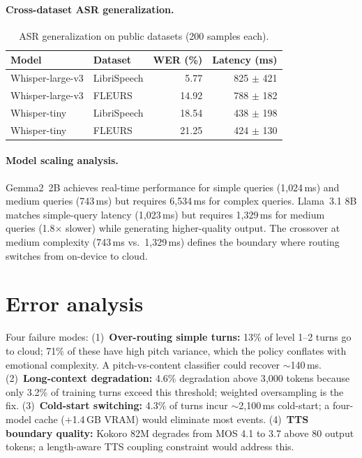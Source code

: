 \documentclass{article}
\begin{document}
\paragraph{Cross-dataset ASR generalization.}

\begin{table}[H]
\centering
\caption{ASR generalization on public datasets (200 samples each).}
\label{tab:cross_dataset}
\small
\begin{tabular}{llrr}
\toprule
Model & Dataset & WER (\%) & Latency (ms) \\
\midrule
Whisper-large-v3 & LibriSpeech & 5.77 & 825 $\pm$ 421 \\
Whisper-large-v3 & FLEURS & 14.92 & 788 $\pm$ 182 \\
Whisper-tiny & LibriSpeech & 18.54 & 438 $\pm$ 198 \\
Whisper-tiny & FLEURS & 21.25 & 424 $\pm$ 130 \\
\bottomrule
\end{tabular}
\end{table}

\paragraph{Model scaling analysis.} Gemma2~2B achieves real-time performance for simple queries (1{,}024\,ms) and medium queries (743\,ms) but requires 6{,}534\,ms for complex queries. Llama~3.1 8B matches simple-query latency (1{,}023\,ms) but requires 1{,}329\,ms for medium queries (1.8$\times$ slower) while generating higher-quality output. The crossover at medium complexity (743\,ms vs.\ 1{,}329\,ms) defines the boundary where routing switches from on-device to cloud.

\section{Error analysis}
\label{app:error}

Four failure modes: (1)~\textbf{Over-routing simple turns:} 13\% of level 1--2 turns go to cloud; 71\% of these have high pitch variance, which the policy conflates with emotional complexity. A pitch-vs-content classifier could recover $\sim$140\,ms. (2)~\textbf{Long-context degradation:} 4.6\% degradation above 3{,}000 tokens because only 3.2\% of training turns exceed this threshold; weighted oversampling is the fix. (3)~\textbf{Cold-start switching:} 4.3\% of turns incur $\sim$2{,}100\,ms cold-start; a four-model cache ($+$1.4\,GB VRAM) would eliminate most events. (4)~\textbf{TTS boundary quality:} Kokoro 82M degrades from MOS 4.1 to 3.7 above 80 output tokens; a length-aware TTS coupling constraint would address this.
\end{document}
